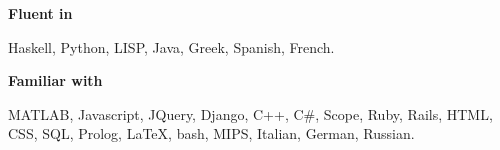 \documentclass[margin,line]{resume}
\begin{document}
\begin{resume}
    \textbf{Fluent in} \par\vspace{-4mm}
    {\addtolength{\leftskip}{2 mm} 
     Haskell, Python, LISP, Java, Greek, Spanish, French.
     }

    \textbf{Familiar with}\par\vspace{-4mm}
    {\addtolength{\leftskip}{2 mm} 
      MATLAB, Javascript, JQuery, Django, C++, C\#, Scope,  Ruby, Rails, HTML, CSS,  SQL, Prolog, \LaTeX, bash, MIPS, Italian, German, Russian.
    \par}


\end{resume}
\end{document}
